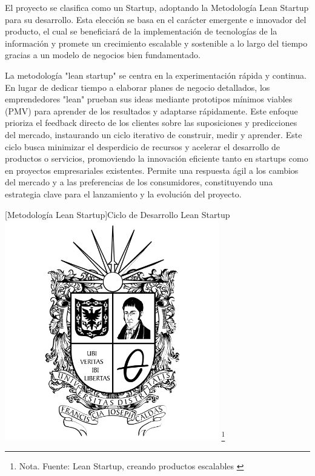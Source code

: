 {El proyecto se clasifica como un Startup, adoptando la Metodología Lean Startup para su desarrollo. Esta elección se basa en el carácter emergente e innovador del producto, el cual se beneficiará de la implementación de tecnologías de la información y promete un crecimiento escalable y sostenible a lo largo del tiempo gracias a un modelo de negocios bien fundamentado.

La metodología "lean startup" se centra en la experimentación rápida y continua. En lugar de dedicar tiempo a elaborar planes de negocio detallados, los emprendedores "lean" prueban sus ideas mediante prototipos mínimos viables (PMV) para aprender de los resultados y adaptarse rápidamente. Este enfoque prioriza el feedback directo de los clientes sobre las suposiciones y predicciones del mercado, instaurando un ciclo iterativo de construir, medir y aprender. Este ciclo busca minimizar el desperdicio de recursos y acelerar el desarrollo de productos o servicios, promoviendo la innovación eficiente tanto en startups como en proyectos empresariales existentes. Permite una respuesta ágil a los cambios del mercado y a las preferencias de los consumidores, constituyendo una estrategia clave para el lanzamiento y la evolución del proyecto.\cite{Blank2013}

\begin{minipage}{0.9\textwidth}
        \centering
        [{Metodología Lean Startup}]{Ciclo de Desarrollo Lean Startup}
        \label{leanStartUp}
         \includegraphics[width=0.7\textwidth]{Content/Images/Escudo_UD.png}
        \footnote{Nota. \textup{Fuente: Lean Startup, creando productos escalables \cite{GioSyst3m}}}
\end{minipage}

}
